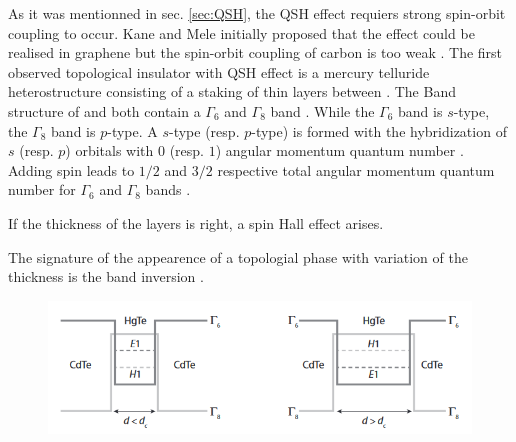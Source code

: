 As it was mentionned in sec. \ref{sec:QSH}, the QSH effect requiers strong spin-orbit coupling to occur. Kane and Mele initially proposed that the effect could be realised in graphene but the spin-orbit coupling of carbon is too weak \cite{cayssol_topological_2021}. The first observed topological insulator with QSH effect is a mercury telluride heterostructure consisting of a staking of thin  layers between  \cite{kane_this_2011}. The Band structure of  and  both contain a $\Gamma_6$ and $\Gamma_8$ band \cite{bernevig_topological_2013}. While the $\Gamma_6$ band is $s$-type, the $\Gamma_8$ band is $p$-type. A $s$-type (resp. $p$-type) is formed with the hybridization of $s$ (resp. $p$) orbitals with $0$ (resp. $1$) angular momentum quantum number \cite{girvin_modern_2019}. Adding spin leads to $1/2$ and $3/2$ respective total angular momentum quantum number for $\Gamma_6$ and $\Gamma_8$ bands \cite{bernevig_topological_2013}. 

If the thickness of the  layers is right, a spin Hall effect arises. 

The signature of the appearence of a topologial phase with variation of the thickness is the band inversion \cite{bansil_colloquium_2016}. 

\begin{figure}[h!]
    \includegraphics{sections/visuel/Hg}
    \caption{\cite{bernevig_topological_2013}}
\end{figure}